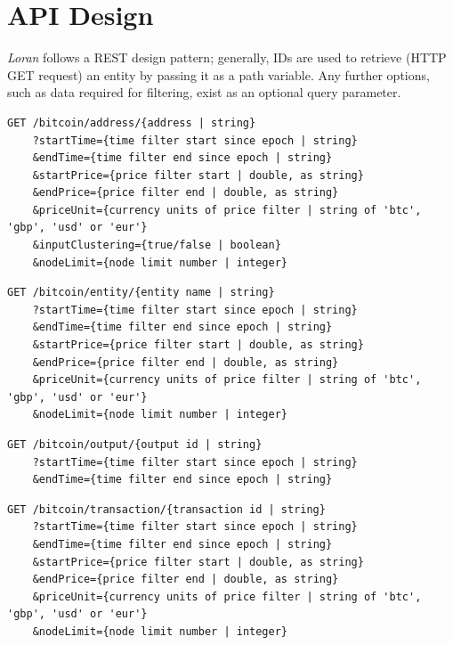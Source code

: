 \section{API Design}
\textit{Loran} follows a REST design pattern; generally, IDs are used to retrieve (HTTP GET request) an entity by passing it as a path variable. Any further options, such as data required for filtering, exist as an optional query parameter.  

\begin{lstlisting}[label={lst:address-api}, caption={Get an address using the unique full address. Several optional query parameters for filtering by time, price and enabling clustering and node limiting.}, breaklines=true, basicstyle=\small]
GET /bitcoin/address/{address | string}
    ?startTime={time filter start since epoch | string}
    &endTime={time filter end since epoch | string}
    &startPrice={price filter start | double, as string}
    &endPrice={price filter end | double, as string}
    &priceUnit={currency units of price filter | string of 'btc', 'gbp', 'usd' or 'eur'}
    &inputClustering={true/false | boolean}
    &nodeLimit={node limit number | integer}
\end{lstlisting}

\begin{lstlisting}[caption={Get an entity using the unique name of the entity . All query parameters are optional for filtering.}, breaklines=true, basicstyle=\small]
GET /bitcoin/entity/{entity name | string}
    ?startTime={time filter start since epoch | string}
    &endTime={time filter end since epoch | string}
    &startPrice={price filter start | double, as string}
    &endPrice={price filter end | double, as string}
    &priceUnit={currency units of price filter | string of 'btc', 'gbp', 'usd' or 'eur'}
    &nodeLimit={node limit number | integer}
\end{lstlisting}

\begin{lstlisting}[caption={Get an output with a unique output ID. All query parameters are optional for filtering.}, breaklines=true, basicstyle=\small]
GET /bitcoin/output/{output id | string}
    ?startTime={time filter start since epoch | string}
    &endTime={time filter end since epoch | string}
\end{lstlisting}

\begin{lstlisting}[caption={Get a transaction with a unique transaction ID (txid). All query parameters are optional for filtering.}, breaklines=true, basicstyle=\small]
GET /bitcoin/transaction/{transaction id | string}
    ?startTime={time filter start since epoch | string}
    &endTime={time filter end since epoch | string}
    &startPrice={price filter start | double, as string}
    &endPrice={price filter end | double, as string}
    &priceUnit={currency units of price filter | string of 'btc', 'gbp', 'usd' or 'eur'}
    &nodeLimit={node limit number | integer}
\end{lstlisting}

